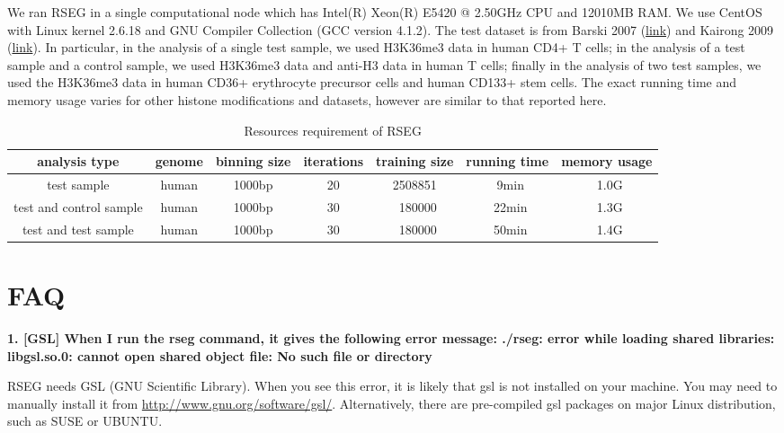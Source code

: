 \documentclass[11pt]{report}
\begin{document}
We ran RSEG in a single computational node which has Intel(R) Xeon(R)
E5420 @ 2.50GHz CPU and 12010MB RAM. We use CentOS with Linux kernel
2.6.18 and GNU Compiler Collection (GCC version 4.1.2). The test
dataset is from Barski 2007
(\href{http://dir.nhlbi.nih.gov/papers/lmi/epigenomes/hgtcell.aspx}{link})
and Kairong 2009
(\href{http://dir.nhlbi.nih.gov/papers/lmi/epigenomes/hghscmethylation.aspx}{link}). In
particular, in the analysis of a single test sample, we used H3K36me3
data in human CD4+ T cells; in the analysis of a test sample and a
control sample, we used H3K36me3 data and anti-H3 data in human T
cells; finally in the analysis of two test samples, we used the
H3K36me3 data in human CD36+ erythrocyte precursor cells and human
CD133+ stem cells. The exact running time and memory usage varies for
other histone modifications and datasets, however are similar to that
reported here.

 
\begin{table}[th]
  \centering
  \begin{tabular}{c c c c c c c }
    \hline
    analysis type & genome & binning size & iterations & training size
    & running time & memory usage\\
    \hline
    test sample & human & 1000bp & 20 & 2508851 & ~9min & ~1.0G \\
    test and control sample & human & 1000bp & 30 & ~180000 & ~22min & ~1.3G \\
    test and test sample & human & 1000bp & 30 & ~180000 & ~50min &
    ~1.4G \\
   \hline
  \end{tabular}
  \caption{Resources requirement of RSEG}
  \label{tab:format-bin-diff}
\end{table}

\section{FAQ}
\label{sec:faq}

\textbf{1. [GSL] 
When I run the rseg command, it gives  the following error message: ./rseg:
error while loading shared libraries: libgsl.so.0: cannot open  shared object
file: No such file or directory}


RSEG needs GSL (GNU Scientific Library).  When you see this error, it is likely
that gsl is not installed on your machine. You may need to manually install it
from \url{http://www.gnu.org/software/gsl/}. Alternatively, there are
pre-compiled gsl packages on major Linux distribution, such as SUSE or UBUNTU.
\end{document}
